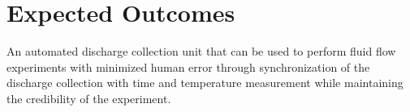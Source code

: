 \section{Expected Outcomes}

An automated discharge collection unit that can be used to perform fluid flow experiments with minimized human error through synchronization of the discharge collection with time and temperature measurement while maintaining the credibility of the experiment. 

